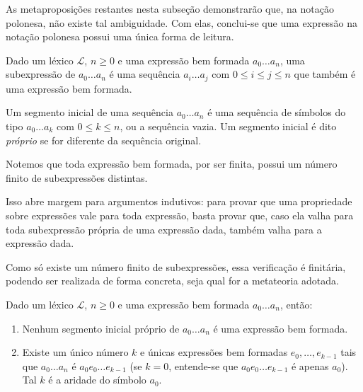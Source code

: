 As metaproposições restantes nesta subseção demonstrarão que, na notação polonesa, não existe tal ambiguidade.
Com elas, conclui-se que uma expressão na notação polonesa possui uma única forma de leitura.
\begin{metadefinition}\label{mdef:subexpressaoESegmentoInicial}
Dado um léxico $\mathcal L$, $n\geq 0$ e uma expressão bem formada $a_0\dots a_n$, uma subexpressão de $a_0\dots a_n$ é uma sequência $a_i\dots a_j$ com $0\leq i\leq j\leq n$ que também é uma expressão bem formada.

Um segmento inicial de uma sequência $a_0\dots a_n$ é uma sequência de símbolos do tipo $a_0\dots a_k$ com $0\leq k\leq n$, ou a sequência vazia.
Um segmento inicial é dito \emph{próprio} se for diferente da sequência original.
\end{metadefinition}

Notemos que toda expressão bem formada, por ser finita, possui um número finito de subexpressões distintas.

Isso abre margem para argumentos indutivos: para provar que uma propriedade sobre expressões vale para toda expressão, basta provar que, caso ela valha para toda subexpressão própria de uma expressão dada, também valha para a expressão dada.

Como só existe um número finito de subexpressões, essa verificação é finitária, podendo ser realizada de forma concreta, seja qual for a metateoria adotada.

\begin{metaproposition}\label{mprop:decomposicaoExpressoes}
Dado um léxico $\mathcal L$, $n\geq 0$ e uma expressão bem formada $a_0\dots a_n$, então:

\begin{enumerate}[label=(\roman*)]
    \item Nenhum segmento inicial próprio de $a_0\dots a_n$ é uma expressão bem formada.
    \item Existe um único número $k$ e únicas expressões bem formadas $e_0,\dots,e_{k-1}$ tais que $a_0\dots a_n$ é $a_0e_0\dots e_{k-1}$ (se $k=0$, entende-se que $a_0e_0\dots e_{k-1}$ é apenas $a_0$).
    Tal $k$ é a aridade do símbolo $a_0$.
\end{enumerate}
\end{metaproposition}

